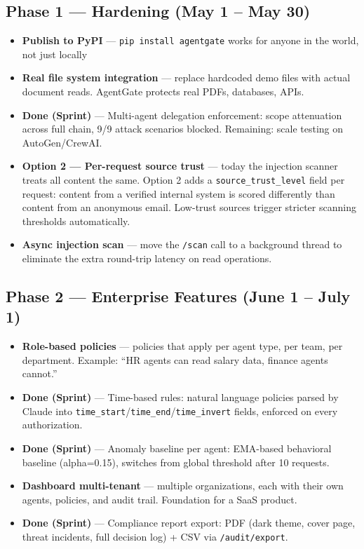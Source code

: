 \documentclass[12pt, a4paper]{article}
\begin{document}
\subsection{Phase 1 — Hardening (May 1 -- May 30)}

\begin{itemize}[noitemsep]
  \item \textbf{Publish to PyPI} — \texttt{pip install agentgate} works for anyone in the world, not just locally
  \item \textbf{Real file system integration} — replace hardcoded demo files with actual document reads. AgentGate protects real PDFs, databases, APIs.
  \item \textcolor{permitgreen}{\textbf{Done (Sprint)}} — Multi-agent delegation enforcement: scope attenuation across full chain, 9/9 attack scenarios blocked. Remaining: scale testing on AutoGen/CrewAI.
  \item \textbf{Option 2 — Per-request source trust} — today the injection scanner treats all content the same. Option 2 adds a \texttt{source\_trust\_level} field per request: content from a verified internal system is scored differently than content from an anonymous email. Low-trust sources trigger stricter scanning thresholds automatically.
  \item \textbf{Async injection scan} — move the \texttt{/scan} call to a background thread to eliminate the extra round-trip latency on read operations.
\end{itemize}

\subsection{Phase 2 — Enterprise Features (June 1 -- July 1)}

\begin{itemize}[noitemsep]
  \item \textbf{Role-based policies} — policies that apply per agent type, per team, per department. Example: ``HR agents can read salary data, finance agents cannot.''
  \item \textcolor{permitgreen}{\textbf{Done (Sprint)}} — Time-based rules: natural language policies parsed by Claude into \texttt{time\_start}/\texttt{time\_end}/\texttt{time\_invert} fields, enforced on every authorization.
  \item \textcolor{permitgreen}{\textbf{Done (Sprint)}} — Anomaly baseline per agent: EMA-based behavioral baseline (alpha=0.15), switches from global threshold after 10 requests.
  \item \textbf{Dashboard multi-tenant} — multiple organizations, each with their own agents, policies, and audit trail. Foundation for a SaaS product.
  \item \textcolor{permitgreen}{\textbf{Done (Sprint)}} — Compliance report export: PDF (dark theme, cover page, threat incidents, full decision log) + CSV via \texttt{/audit/export}.
\end{itemize}
\end{document}
